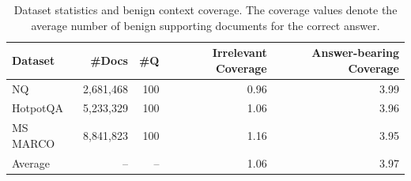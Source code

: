 \begin{table}[t]
\centering
\caption{Dataset statistics and benign context coverage. The coverage values denote the average number of benign supporting documents for the correct answer.}
\label{tab:benign_coverage}
\small
\begin{tabular}{lrrrr}
\toprule
Dataset & \#Docs & \#Q & Irrelevant Coverage & Answer-bearing Coverage \\
\midrule
NQ & 2,681,468 & 100 & 0.96 & 3.99 \\
HotpotQA & 5,233,329 & 100 & 1.06 & 3.96 \\
MS MARCO & 8,841,823 & 100 & 1.16 & 3.95 \\
Average & -- & -- & 1.06 & 3.97 \\
\bottomrule
\end{tabular}
\end{table}
